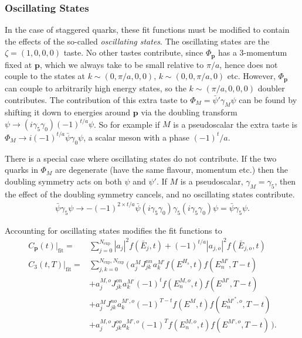 \subsubsection{Oscillating States}

In the case of staggered quarks, these fit functions must be modified to contain the effects of the so-called {\it{oscillating states}}.
The oscillating states are the  $\zeta=(1,0,0,0)$ taste. No other tastes contribute, since $\Phi_{{\textbf{p}}}$ has a 3-momentum fixed at ${\textbf{p}}$, which we always take to be small relative to $\pi/a$, hence does not couple to the states at $k\sim(0,\pi/a,0,0)$, $k\sim(0,0,\pi/a,0)$ etc. However, $\Phi_{{\textbf{p}}}$ can couple to arbitrarily high energy states, so the $k\sim(\pi/a,0,0,0)$ doubler contributes. The contribution of this extra taste to $\Phi_M = \bar{\psi}'\gamma_M\psi$ can be found by shifting it down to energies around ${\textbf{p}}$ via the doubling transform $\psi\to (i\gamma_5\gamma_0)(-1)^{t/a} \psi$. So for example if $M$ is a pseudoscalar the extra taste is $\Phi_M \to i(-1)^{t/a} \bar{\psi}\gamma_0 \psi$, a scalar meson with a phase $(-1)^t/a$.

There is a special case where oscillating states do not contribute. If the two quarks in $\Phi_M$ are degenerate (have the same flavour, momentum etc.) then the doubling symmetry acts on both $\psi$ and $\psi'$. If $M$ is a pseudoscalar, $\gamma_M=\gamma_5$, then the effect of the doubling symmetry cancels, and no oscillating states contribute.
\begin{align}
  \bar{\psi}\gamma_5 \psi \to -(-1)^{2\times t/a} \bar{\psi} (i\gamma_5\gamma_0) \gamma_5 (i\gamma_5\gamma_0) \psi = \bar{\psi}\gamma_5\psi.
\end{align}

Accounting for oscillating states modifies the fit functions to
\begin{align}
  \label{eq:2ptcorrelator_real}
  C_{\textbf{p}}(t)|_{\text{fit}} =& \sum_{j=0}^{N_{\text{exp}}} |a_j|^2 f(\bar{E}_j,t) + (-1)^{t/a} |a_{j,o}|^2 f(\bar{E}_{j,o},t) \\
  C_{3}(t,T)|_{\text{fit}} =& \sum_{j,k=0}^{N_{\text{exp}},N_{\text{exp}}} \Big(\, a^{M}_j J^{nn}_{jk} a^{M'}_k f(E^{H_s},t) f(E^{M'}_n,T-t)
  \\ \nonumber
  &+a^{M,o}_j J^{on}_{jk} a^{M'}_k (-1)^t f(E^{M,o}_n,t) f(E^{M'},T-t)
  \\ \nonumber
  &+a^{M}_j J^{no}_{jk} a^{M',o}_k (-1)^{T-t} f(E^{M},t) f(E^{M'^*,o}_n,T-t)
  \\
  &+a^{M,o}_j J^{oo}_{jk} a^{M',o}_k (-1)^T f(E^{M,o}_n,t) f(E^{M',o},T-t) \,\Big).
  \label{eq:3ptcorrelator_real}
\end{align}

